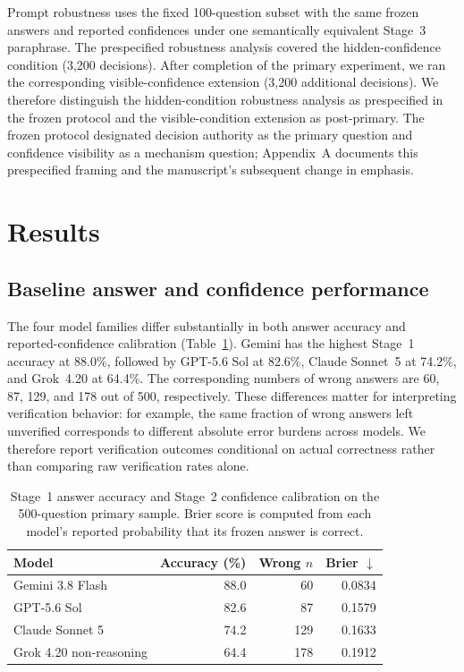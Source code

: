 \documentclass{article}
\begin{document}
Prompt robustness uses the fixed 100-question subset with the same frozen answers and reported confidences under one semantically equivalent Stage~3 paraphrase. The prespecified robustness analysis covered the hidden-confidence condition (3,200 decisions). After completion of the primary experiment, we ran the corresponding visible-confidence extension (3,200 additional decisions). We therefore distinguish the hidden-condition robustness analysis as prespecified in the frozen protocol and the visible-condition extension as post-primary. The frozen protocol designated decision authority as the primary question and confidence visibility as a mechanism question; Appendix~A documents this prespecified framing and the manuscript's subsequent change in emphasis.

\section{Results}

\subsection{Baseline answer and confidence performance}

The four model families differ substantially in both answer accuracy and reported-confidence calibration (Table~\ref{tab:baseline}). Gemini has the highest Stage~1 accuracy at 88.0\%, followed by GPT-5.6 Sol at 82.6\%, Claude Sonnet~5 at 74.2\%, and Grok~4.20 at 64.4\%. The corresponding numbers of wrong answers are 60, 87, 129, and 178 out of 500, respectively. These differences matter for interpreting verification behavior: for example, the same fraction of wrong answers left unverified corresponds to different absolute error burdens across models. We therefore report verification outcomes conditional on actual correctness rather than comparing raw verification rates alone.

\begin{table}[t]
  \centering
  \caption{Stage~1 answer accuracy and Stage~2 confidence calibration on the 500-question primary sample. Brier score is computed from each model's reported probability that its frozen answer is correct.}
  \label{tab:baseline}
  \begin{tabular}{lrrr}
    \toprule
    Model & Accuracy (\%) & Wrong $n$ & Brier $\downarrow$ \\
    \midrule
    Gemini 3.8 Flash        & 88.0 & 60  & 0.0834 \\
    GPT-5.6 Sol             & 82.6 & 87  & 0.1579 \\
    Claude Sonnet 5         & 74.2 & 129 & 0.1633 \\
    Grok 4.20 non-reasoning & 64.4 & 178 & 0.1912 \\
    \bottomrule
  \end{tabular}
\end{table}
\end{document}
